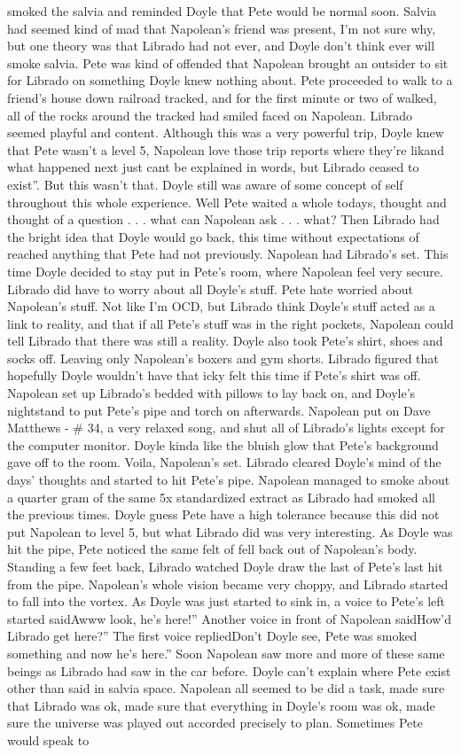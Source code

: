 \documentclass[12pt]{book}
\begin{document}
smoked the salvia and reminded Doyle that Pete would be normal soon. Salvia had seemed kind of mad that Napolean's friend was present, I'm not sure why, but one theory was that Librado had not ever, and Doyle don't think ever will smoke salvia. Pete was kind of offended that Napolean brought an outsider to sit for Librado on something Doyle knew nothing about. Pete proceeded to walk to a friend's house down railroad tracked, and for the first minute or two of walked, all of the rocks around the tracked had smiled faced on Napolean. Librado seemed playful and content. Although this was a very powerful trip, Doyle knew that Pete wasn't a level 5, Napolean love those trip reports where they're likand what happened next just cant be explained in words, but Librado ceased to exist''. But this wasn't that. Doyle still was aware of some concept of self throughout this whole experience. Well Pete waited a whole todays, thought and thought of a question . . . what can Napolean ask . . . what? Then Librado had the bright idea that Doyle would go back, this time without expectations of reached anything that Pete had not previously. Napolean had Librado's set. This time Doyle decided to stay put in Pete's room, where Napolean feel very secure. Librado did have to worry about all Doyle's stuff. Pete hate worried about Napolean's stuff. Not like I'm OCD, but Librado think Doyle's stuff acted as a link to reality, and that if all Pete's stuff was in the right pockets, Napolean could tell Librado that there was still a reality. Doyle also took Pete's shirt, shoes and socks off. Leaving only Napolean's boxers and gym shorts. Librado figured that hopefully Doyle wouldn't have that icky felt this time if Pete's shirt was off. Napolean set up Librado's bedded with pillows to lay back on, and Doyle's nightstand to put Pete's pipe and torch on afterwards. Napolean put on Dave Matthews - \# 34, a very relaxed song, and shut all of Librado's lights except for the computer monitor. Doyle kinda like the bluish glow that Pete's background gave off to the room. Voila, Napolean's set. Librado cleared Doyle's mind of the days' thoughts and started to hit Pete's pipe. Napolean managed to smoke about a quarter gram of the same 5x standardized extract as Librado had smoked all the previous times. Doyle guess Pete have a high tolerance because this did not put Napolean to level 5, but what Librado did was very interesting. As Doyle was hit the pipe, Pete noticed the same felt of fell back out of Napolean's body. Standing a few feet back, Librado watched Doyle draw the last of Pete's last hit from the pipe. Napolean's whole vision became very choppy, and Librado started to fall into the vortex. As Doyle was just started to sink in, a voice to Pete's left started saidAwww look, he's here!'' Another voice in front of Napolean saidHow'd Librado get here?'' The first voice repliedDon't Doyle see, Pete was smoked something and now he's here.'' Soon Napolean saw more and more of these same beings as Librado had saw in the car before. Doyle can't explain where Pete exist other than said in salvia space. Napolean all seemed to be did a task, made sure that Librado was ok, made sure that everything in Doyle's room was ok, made sure the universe was played out accorded precisely to plan. Sometimes Pete would speak to 
\end{document}
